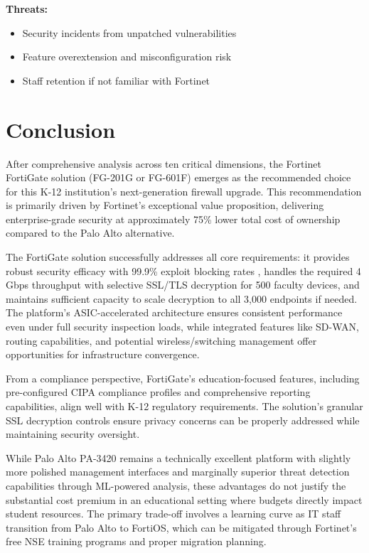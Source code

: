 \documentclass[12pt]{article}
\begin{document}
\textbf{Threats:}
\begin{itemize}
    \item Security incidents from unpatched vulnerabilities \cite{bleepingcomputer2025}
    \item Feature overextension and misconfiguration risk
    \item Staff retention if not familiar with Fortinet
\end{itemize}

\section{Conclusion}

After comprehensive analysis across ten critical dimensions, the Fortinet FortiGate solution (FG-201G or FG-601F) emerges as the recommended choice for this K-12 institution's next-generation firewall upgrade. This recommendation is primarily driven by Fortinet's exceptional value proposition, delivering enterprise-grade security at approximately 75\% lower total cost of ownership compared to the Palo Alto alternative.

The FortiGate solution successfully addresses all core requirements: it provides robust security efficacy with 99.9\% exploit blocking rates \cite{cyberratings2023}, handles the required 4 Gbps throughput with selective SSL/TLS decryption for 500 faculty devices, and maintains sufficient capacity to scale decryption to all 3,000 endpoints if needed. The platform's ASIC-accelerated architecture ensures consistent performance even under full security inspection loads, while integrated features like SD-WAN, routing capabilities, and potential wireless/switching management offer opportunities for infrastructure convergence.

From a compliance perspective, FortiGate's education-focused features, including pre-configured CIPA compliance profiles and comprehensive reporting capabilities, align well with K-12 regulatory requirements. The solution's granular SSL decryption controls ensure privacy concerns can be properly addressed while maintaining security oversight.

While Palo Alto PA-3420 remains a technically excellent platform with slightly more polished management interfaces and marginally superior threat detection capabilities through ML-powered analysis, these advantages do not justify the substantial cost premium in an educational setting where budgets directly impact student resources. The primary trade-off involves a learning curve as IT staff transition from Palo Alto to FortiOS, which can be mitigated through Fortinet's free NSE training programs and proper migration planning.
\end{document}
